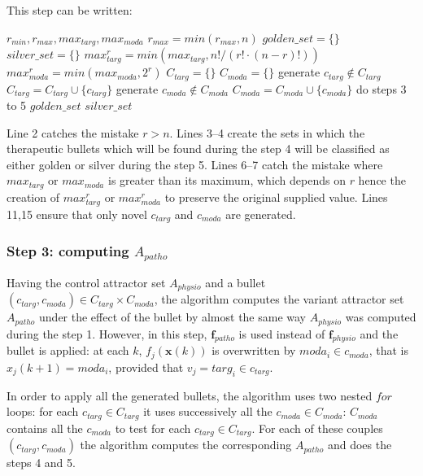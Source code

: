 \documentclass[oneside,a4paper,onecolumn,notitlepage,final]{article}
\begin{document}
This step can be written:
\begin{algorithmic}[1]
\REQUIRE $r_{min},r_{max},max_{targ},max_{moda}$
\STATE $r_{max}=min(r_{max},n)$
\STATE $golden\_set=\lbrace \rbrace$
\STATE $silver\_set=\lbrace \rbrace$
    \STATE $max_{targ}^{r}=min(max_{targ},n!/(r!\cdot (n-r)!))$
    \STATE $max_{moda}^{r}=min(max_{moda},2^{r})$
    \STATE $C_{targ}=\lbrace \rbrace$
    \STATE $C_{moda}=\lbrace \rbrace$
        \STATE generate $c_{targ}\notin C_{targ}$
        \STATE $C_{targ}=C_{targ}\cup \lbrace c_{targ}\rbrace$
    \ENDWHILE
        \STATE generate $c_{moda}\notin C_{moda}$
        \STATE $C_{moda}=C_{moda}\cup \lbrace c_{moda}\rbrace$
    \ENDWHILE
    \STATE do steps 3 to 5
\ENDFOR
\ENSURE $golden\_set$
\ENSURE $silver\_set$
\end{algorithmic}
Line 2 catches the mistake $r>n$. Lines 3--4 create the sets in which the therapeutic bullets which will be found during the step 4 will be classified as either golden or silver during the step 5. Lines 6--7 catch the mistake where $max_{targ}$ or $max_{moda}$ is greater than its maximum, which depends on $r$ hence the creation of $max_{targ}^{r}$ or $max_{moda}^{r}$ to preserve the original supplied value. Lines 11,15 ensure that only novel $c_{targ}$ and $c_{moda}$ are generated.

\subsubsection{Step 3: computing $A_{patho}$}
Having the control attractor set $A_{physio}$ and a bullet $(c_{targ},c_{moda})\in C_{targ}\times C_{moda}$, the algorithm computes the variant attractor set $A_{patho}$ under the effect of the bullet by almost the same way $A_{physio}$ was computed during the step 1. However, in this step, $\boldsymbol{f}_{patho}$ is used instead of $\boldsymbol{f}_{physio}$ and the bullet is applied: at each $k$, $f_j(\boldsymbol{x}(k))$ is overwritten by $moda_i\in c_{moda}$, that is $x_j(k+1)=moda_i$, provided that $v_j=targ_i\in c_{targ}$.

In order to apply all the generated bullets, the algorithm uses two nested $for$ loops: for each $c_{targ}\in C_{targ}$ it uses successively all the $c_{moda}\in C_{moda}$: $C_{moda}$ contains all the $c_{moda}$ to test for each $c_{targ}\in C_{targ}$. For each of these couples $(c_{targ},c_{moda})$ the algorithm computes the corresponding $A_{patho}$ and does the steps 4 and 5.
\end{document}
